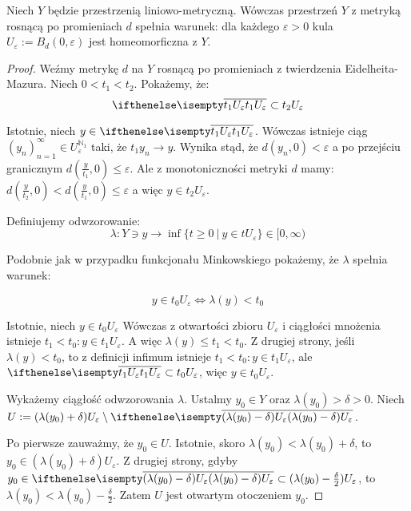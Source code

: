 \begin{lem} \label{lem:ball-homeomorphism}
  Niech $Y$ będzie przestrzenią liniowo-metryczną. Wówczas przestrzeń $Y$ z metryką rosnącą po promieniach $d$ spełnia warunek: dla każdego $\varepsilon > 0$ kula $U_\varepsilon := B_d(0, \varepsilon)$ jest homeomorficzna z $Y$.
  
  \begin{proof}
    Weźmy metrykę $d$ na $Y$ rosnącą po promieniach z twierdzenia Eidelheita-Mazura. Niech $0 < t_1 < t_2$. Pokażemy, że:
    \[
      \cl{t_1 U_\varepsilon} \subset t_2 U_\varepsilon
    \]
    
    Istotnie, niech $y \in \cl{t_1 U_\varepsilon}$. Wówczas istnieje ciąg $(y_n)_{n=1}^\infty \in U_\varepsilon^{\mathbb{N}_1}$ taki, że $t_1 y_n \to y$. Wynika stąd, że $d(y_n, 0) < \varepsilon$ a po przejściu granicznym $d(\frac{y}{t_1}, 0) \leq \varepsilon$. Ale z monotoniczności metryki $d$ mamy: $d(\frac{y}{t_2}, 0) < d(\frac{y}{t_1}, 0) \leq \varepsilon$ a więc $y \in t_2 U_\varepsilon$.
    
    Definiujemy odwzorowanie:
    \[
      \lambda: Y \ni y \to \inf \{t \geq 0\ |\ y \in t U_\varepsilon\} \in [0, \infty)
    \]
    
    Podobnie jak w przypadku funkcjonału Minkowskiego pokażemy, że $\lambda$ spełnia warunek:
    
    \[
      y \in t_0 U_\varepsilon \iff \lambda(y) < t_0
    \]
    
    Istotnie, niech $y \in t_0 U_\varepsilon$
    Wówczas z otwartości zbioru $U_\varepsilon$ i ciągłości mnożenia istnieje $t_1 < t_0: y \in t_1 U_\varepsilon$.
    A więc $\lambda(y) \leq t_1 < t_0$.
    Z drugiej strony, jeśli $\lambda(y) < t_0$, to z definicji infimum istnieje $t_1 < t_0: y \in t_1 U_\varepsilon$, ale $\cl{t_1 U_\varepsilon} \subset t_0 U_\varepsilon$, więc $y \in t_0 U_\varepsilon$.

    Wykażemy ciągłość odwzorowania $\lambda$.
    Ustalmy $y_0 \in Y$ oraz $\lambda(y_0) > \delta > 0$.
    Niech $U := (\lambda(y_0) + \delta) U_\varepsilon \setminus \cl{(\lambda(y_0)-\delta) U_\varepsilon}$.
    
    Po pierwsze zauważmy, że $y_0 \in U$.
    Istotnie, skoro $\lambda(y_0) < \lambda(y_0) + \delta$, to $y_0 \in (\lambda(y_0) + \delta) U_\varepsilon$.
    Z drugiej strony, gdyby $y_0 \in \cl{(\lambda(y_0) - \delta) U_\varepsilon} \subset (\lambda(y_0) - \frac{\delta}{2}) U_\varepsilon$, to $\lambda(y_0) < \lambda(y_0) - \frac{\delta}{2}$.
    Zatem $U$ jest otwartym otoczeniem $y_0$.
    

\end{proof}
\end{lem}
